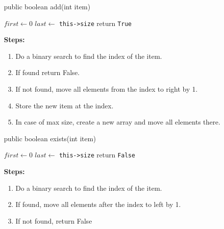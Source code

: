 \documentclass{article}
\begin{document}
\begin{algorithm}[H]
  \caption{public boolean add(int item)}\label{alg:1.2}
  \DontPrintSemicolon
  $first \gets 0$\;
  $last \gets$ \verb~this->size~\;
  return \verb~True~\;
\end{algorithm}
\textbf{Steps:}
\begin{enumerate}
\item Do a binary search to find the index of the item.
\item If found return False.
\item If not found, move all elements from the index to right by 1.
\item Store the new item at the index.
\item In case of max size, create a new array and move all elements there.
\end{enumerate}

\begin{algorithm}[H]
  \caption{public boolean exists(int item)}\label{alg:1.3}
  \DontPrintSemicolon
  $first \gets 0$\;
  $last \gets$ \verb~this->size~\;
  return \verb~False~\;
\end{algorithm}
\textbf{Steps:}
\begin{enumerate}
\item Do a binary search to find the index of the item.
\item If found, move all elements after the index to left by 1.
\item If not found, return False
\end{enumerate}
\end{document}
